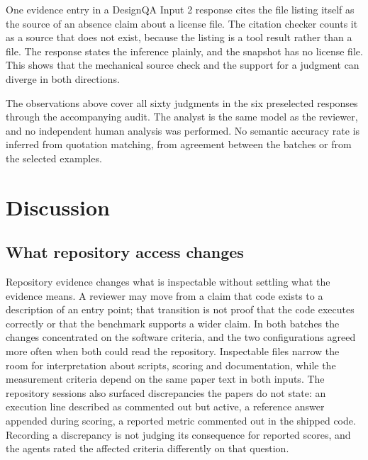 \documentclass[10pt,conference]{IEEEtran}
\begin{document}
One evidence entry in a DesignQA Input 2 response cites the file listing itself as the source of an absence claim about a license file. The citation checker counts it as a source that does not exist, because the listing is a tool result rather than a file. The response states the inference plainly, and the snapshot has no license file. This shows that the mechanical source check and the support for a judgment can diverge in both directions.

The observations above cover all sixty judgments in the six preselected responses through the accompanying audit. The analyst is the same model as the reviewer, and no independent human analysis was performed. No semantic accuracy rate is inferred from quotation matching, from agreement between the batches or from the selected examples.

\section{Discussion}
\subsection{What repository access changes}
Repository evidence changes what is inspectable without settling what the evidence means. A reviewer may move from a claim that code exists to a description of an entry point; that transition is not proof that the code executes correctly or that the benchmark supports a wider claim. In both batches the changes concentrated on the software criteria, and the two configurations agreed more often when both could read the repository. Inspectable files narrow the room for interpretation about scripts, scoring and documentation, while the measurement criteria depend on the same paper text in both inputs. The repository sessions also surfaced discrepancies the papers do not state: an execution line described as commented out but active, a reference answer appended during scoring, a reported metric commented out in the shipped code. Recording a discrepancy is not judging its consequence for reported scores, and the agents rated the affected criteria differently on that question.
\end{document}
